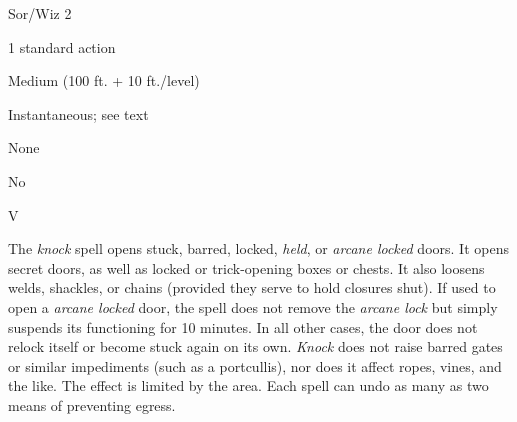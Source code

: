 
\begin{description*}
\item[Level:] Sor/Wiz 2
\item[Casting Time:] 1 standard action
\item[Range:] Medium (100 ft. + 10 ft./level)
\item[Duration:] Instantaneous; see text
\item[Saving Throw:] None
\item[Spell Resistance:] No
\item[Components:] V
\end{description*}

The \textit{knock} spell opens stuck, barred, locked, \textit{held}, or \textit{arcane
locked} doors. It opens secret doors, as well as locked or trick-opening boxes
or chests. It also loosens welds, shackles, or chains (provided they serve to hold
closures shut). If used to open a \textit{arcane locked} door, the spell does not
remove the \textit{arcane lock} but simply suspends its functioning for 10 minutes.
In all other cases, the door does not relock itself or become stuck again on its
own. \textit{Knock} does not raise barred gates or similar impediments (such as
a portcullis), nor does it affect ropes, vines, and the like. The effect is limited
by the area. Each spell can undo as many as two means of preventing egress.
